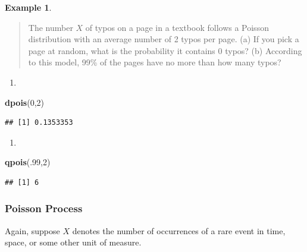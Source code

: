 \documentclass[
]{book}
\newenvironment{Shaded}{\begin{snugshade}}{\end{snugshade}}
\newcommand{\DecValTok}[1]{\textcolor[rgb]{0.00,0.00,0.81}{#1}}
\newcommand{\FunctionTok}[1]{\textcolor[rgb]{0.13,0.29,0.53}{\textbf{#1}}}
\newcommand{\NormalTok}[1]{#1}
\providecommand{\tightlist}{%
  \setlength{\itemsep}{0pt}\setlength{\parskip}{0pt}}
\theoremstyle{definition}
\theoremstyle{definition}
\newtheorem{example}{Example}[chapter]
\theoremstyle{definition}
\theoremstyle{definition}
\theoremstyle{remark}
\begin{document}
\begin{example}
\protect\hypertarget{exm:pois-typos-R}{}\label{exm:pois-typos-R}\leavevmode

\begin{quote}
The number \(X\) of typos on a page in a textbook follows a Poisson distribution with an average number of 2 typos per page. (a) If you pick a page at random, what is the probability it contains 0 typos? (b) According to this model, 99\% of the pages have no more than how many typos?
\end{quote}

\begin{enumerate}
\def\labelenumi{(\alph{enumi})}
\tightlist
\item
\end{enumerate}

\begin{Shaded}
\begin{Highlighting}[]
\FunctionTok{dpois}\NormalTok{(}\DecValTok{0}\NormalTok{,}\DecValTok{2}\NormalTok{)}
\end{Highlighting}
\end{Shaded}

\begin{verbatim}
## [1] 0.1353353
\end{verbatim}

\begin{enumerate}
\def\labelenumi{(\alph{enumi})}
\setcounter{enumi}{1}
\tightlist
\item
\end{enumerate}

\begin{Shaded}
\begin{Highlighting}[]
\FunctionTok{qpois}\NormalTok{(.}\DecValTok{99}\NormalTok{,}\DecValTok{2}\NormalTok{)}
\end{Highlighting}
\end{Shaded}

\begin{verbatim}
## [1] 6
\end{verbatim}

\end{example}

\subsubsection{Poisson Process}\label{poisson-process-1}

Again, suppose \(X\) denotes the number of occurrences of a rare event in time, space, or some other unit of measure.
\end{document}
